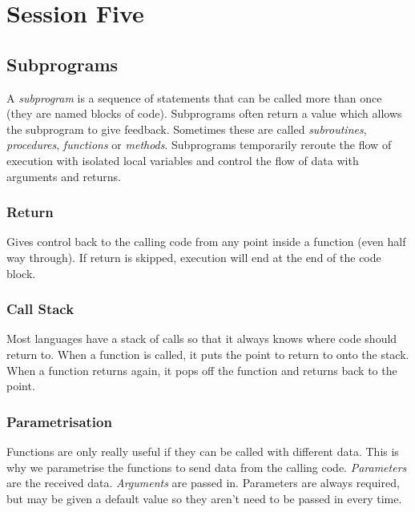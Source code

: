 \section{Session Five}\label{sec:session_five}

\subsection{Subprograms}\label{sub:subprograms}

A \emph{subprogram} is a sequence of statements that can be called more than once (they are named blocks of code).
Subprograms often return a value which allows the subprogram to give feedback.
Sometimes these are called \emph{subroutines}, \emph{procedures}, \emph{functions} or \emph{methods}.
Subprograms temporarily reroute the flow of execution with isolated local variables and control the flow of data with arguments and returns.

\subsubsection{Return}\label{ssub:return}

Gives control back to the calling code from any point inside a function (even half way through).
If return is skipped, execution will end at the end of the code block.

\subsubsection{Call Stack}\label{ssub:call_stack}

Most languages have a stack of calls so that it always knows where code should return to.
When a function is called, it puts the point to return to onto the stack.
When a function returns again, it pops off the function and returns back to the point.

\subsubsection{Parametrisation}\label{ssub:parameterisation}

Functions are only really useful if they can be called with different data.
This is why we parametrise the functions to send data from the calling code.
\emph{Parameters} are the received data.
\emph{Arguments} are passed in.
Parameters are always required, but may be given a default value so they aren't need to be passed in every time.

